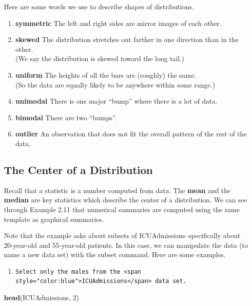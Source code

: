 \documentclass[]{book}
\newenvironment{Shaded}{\begin{snugshade}}{\end{snugshade}}
\newcommand{\DecValTok}[1]{\textcolor[rgb]{0.00,0.00,0.81}{#1}}
\newcommand{\KeywordTok}[1]{\textcolor[rgb]{0.13,0.29,0.53}{\textbf{#1}}}
\newcommand{\NormalTok}[1]{#1}
\providecommand{\tightlist}{%
  \setlength{\itemsep}{0pt}\setlength{\parskip}{0pt}}
\begin{document}
Here are some words we use to describe shapes of distributions.

\begin{enumerate}
\tightlist
\item
  \textbf{symmetric} The left and right sides are mirror images of each other.
\item
  \textbf{skewed} The distribution stretches out farther in one direction than in the other.\\
  (We say the distribution is skewed toward the long tail.)
\item
  \textbf{uniform} The heights of all the bars are (roughly) the same.\\
  (So the data are equally likely to be anywhere within some range.)
\item
  \textbf{unimodal} There is one major ``bump'' where there is a lot of data.
\item
  \textbf{bimodal} There are two ``bumps''.
\item
  \textbf{outlier} An observation that does not fit the overall pattern of the rest of
  the data.
\end{enumerate}

\hypertarget{the-center-of-a-distribution}{%
\subsection{The Center of a Distribution}\label{the-center-of-a-distribution}}

Recall that a statistic is a number computed from data. The \textbf{mean} and the \textbf{median} are key statistics which describe the center of a distribution. We can see through Example 2.11 that numerical summaries are computed using the same template as graphical summaries.

Note that the example asks about subsets of {ICUAdmissions}--specifically about 20-year-old and 55-year-old patients. In this case, we can manipulate the data (to name a new data set) with the subset command. Here are some examples.

\begin{enumerate}
\item
\begin{verbatim}
Select only the males from the <span style="color:blue">ICUAdmissions</span> data set.
\end{verbatim}
\end{enumerate}

\begin{Shaded}
\begin{Highlighting}[]
\KeywordTok{head}\NormalTok{(ICUAdmissions, }\DecValTok{2}\NormalTok{)}
\end{Highlighting}
\end{Shaded}
\end{document}
